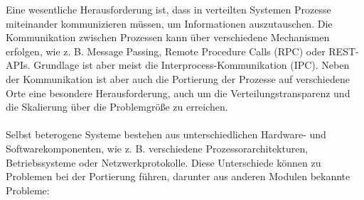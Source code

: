 Eine wesentliche Herausforderung ist, dass in verteilten Systemen Prozesse miteinander kommunizieren müssen, um Informationen auszutauschen. Die Kommunikation zwischen Prozessen kann über verschiedene Mechanismen erfolgen, wie z. B. Message Passing, Remote Procedure Calls (RPC) oder REST-APIs. Grundlage ist aber meist die Interprocess-Kommunikation (IPC).
Neben der Kommunikation ist aber auch die Portierung der Prozesse auf verschiedene Orte eine besondere Herausforderung, auch um die Verteilungstransparenz und die Skalierung über die Problemgröße zu erreichen. \\\\
Selbst beterogene Systeme bestehen aus unterschiedlichen Hardware- und Softwarekomponenten, wie z. B. verschiedene Prozessorarchitekturen, Betriebssysteme oder Netzwerkprotokolle. Diese Unterschiede können zu Problemen bei der Portierung führen, darunter aus anderen Modulen bekannte Probleme:
